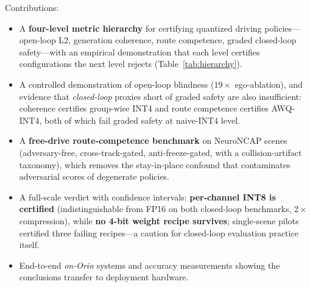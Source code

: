 \documentclass[conference]{IEEEtran}
\begin{document}
Contributions:
\begin{itemize}
\item A \textbf{four-level metric hierarchy} for certifying quantized driving policies---
open-loop L2, generation coherence, route competence, graded closed-loop safety---with an
empirical demonstration that each level certifies configurations the next level rejects
(Table~\ref{tab:hierarchy}).
\item A controlled demonstration of open-loop blindness ($19\times$ ego-ablation), and
evidence that \emph{closed-loop} proxies short of graded safety are also insufficient:
coherence certifies group-wise INT4 and route competence certifies AWQ-INT4, both of which
fail graded safety at naive-INT4 level.
\item A \textbf{free-drive route-competence benchmark} on NeuroNCAP scenes (adversary-free,
cross-track-gated, anti-freeze-gated, with a collision-artifact taxonomy), which removes the
stay-in-place confound that contaminates adversarial scores of degenerate policies.
\item A full-scale verdict with confidence intervals: \textbf{per-channel INT8 is certified}
(indistinguishable from FP16 on both closed-loop benchmarks, $2\times$ compression), while
\textbf{no 4-bit weight recipe survives}; single-scene pilots certified three failing
recipes---a caution for closed-loop evaluation practice itself.
\item End-to-end \emph{on-Orin} systems and accuracy measurements showing the conclusions
transfer to deployment hardware.
\end{itemize}
\end{document}
